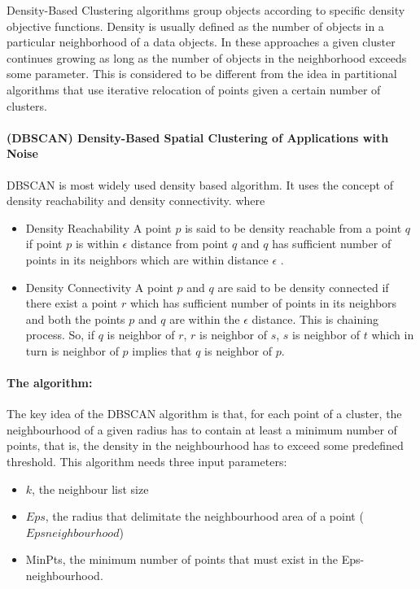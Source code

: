 Density-Based Clustering algorithms group objects according to specific density objective functions.
Density is usually defined as the number of objects in a particular neighborhood of a data objects.
In these approaches a given cluster continues growing as long as the number of objects in the
neighborhood exceeds some parameter. This is considered to be different from the idea in partitional
algorithms that use iterative relocation of points given a certain number of clusters.


\paragraph{(DBSCAN) Density-Based Spatial Clustering of Applications with Noise} DBSCAN is most widely used density based algorithm. It uses the concept of  density reachability and density connectivity\citep{literature_1}. where
\begin{itemize}
\item{Density Reachability} A point $p$ is said to be density reachable from a point $q$ if point $p$ is within $\epsilon$ distance from point $q$ and $q$ has sufficient number of points in its neighbors which are within distance $\epsilon$ .

\item{Density Connectivity} A point $p$ and $q$ are said to be density connected if there exist a point $r$ which has sufficient number of points in its neighbors and both the points $p$ and $q$ are within the $\epsilon$ distance. This is chaining process. So, if $q$ is neighbor of $r$, $r$ is neighbor of $s$, $s$ is neighbor of $t$ which in turn is neighbor of $p$ implies that $q$ is neighbor of $p$.
\end{itemize}

\paragraph{The algorithm:}

\citep{literature_2}  The key idea of the DBSCAN algorithm is that, for each point of a cluster, the neighbourhood 
of a given radius has to contain at least a minimum number of points, that is, the density in 
the neighbourhood has to exceed some predefined threshold. This algorithm needs three 
input parameters:
\begin{itemize}  
\item{$k$, the neighbour list size} 
\item{$Eps$, the radius that delimitate the neighbourhood area of a point ($Epsneighbourhood$)}
\item{MinPts, the minimum number of points that must exist in the Eps-neighbourhood.}
\end{itemize} 

